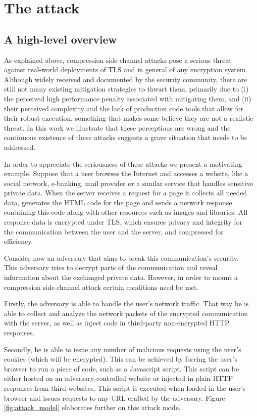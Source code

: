 \section{The attack}\label{sec:attack}

\subsection{A high-level overview}\label{subsec:example}
As explained above, compression side-channel attacks pose a serious threat
against real-world deployments of TLS and in general of any encryption system.
Although widely received and documented by the security community, there are
still not many existing mitigation strategies to thwart them, primarily due to
(i) the perceived high performance penalty associated with mitigating them, and
(ii) their perceived complexity and the lack of production code tools that allow
for their robust execution, something that makes some believe they are not a
realistic threat. In this work we illustrate that these perceptions are
wrong and the continuous existence of these attacks suggests a grave
situation that needs to be addressed.

In order to appreciate the seriousness of these attacks we present a motivating
example. Suppose that a user browses the Internet and accesses a website, like a
social network, e-banking, mail provider or a similar service that handles
sensitive private data. When the server receives a request for a page it
collects all needed data, generates the HTML code for the page and sends a
network response containing this code along with other resources such as images
and libraries. All response data is encrypted under TLS, which ensures privacy
and integrity for the communication between the user and the server, and
compressed for efficiency.

Consider now an adversary that aims to break this communication's security.
This adversary tries to decrypt parts of the communication and reveal
information about the exchanged private data. However, in order to mount a
compression side-channel attack certain conditions need be met.

Firstly, the adversary is able to handle the user's network traffic. That way he
is able to collect and analyze the network packets of the encrypted
communication with the server, as well as inject code in third-party
non-encrypted HTTP responses.

Secondly, he is able to issue any number of malicious requests using the user's
cookies (which will be encrypted). This can be achieved by forcing the user's
browser to run a piece of code, such as a Javascript script. This script can be
either hosted on an adversary-controlled website or injected in plain HTTP
responses from third websites. This script is executed when loaded in the user's
browser and issues requests to any URL crafted by the adversary. Figure
\ref{fig:attack_model} elaborates further on this attack mode.

